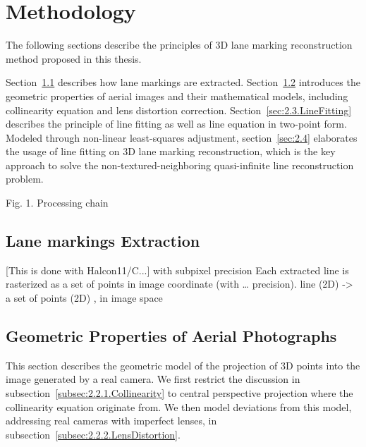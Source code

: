 
\chapter{Methodology}
\label{chap:k2}

The following sections describe the principles of 3D lane marking reconstruction method proposed in this thesis. 

Section~\ref{sec:2.1.LineExtraction} describes how lane markings are extracted.
Section~\ref{sec:2.2.Geometry} introduces the geometric properties of aerial images and their mathematical models, including collinearity equation and lens distortion correction. 
Section~\ref{sec:2.3.LineFitting} describes the principle of line fitting as well as line equation in two-point form.
Modeled through non-linear least-squares adjustment, section~\ref{sec:2.4} elaborates the usage of line fitting on 3D lane marking reconstruction, which is the key approach to solve the non-textured-neighboring quasi-infinite line reconstruction problem.




Fig. 1. Processing chain


\section{Lane markings Extraction}
\label{sec:2.1.LineExtraction}
[This is done with Halcon11/C...]
with subpixel precision
Each extracted line is rasterized as a set of points in image coordinate (with … precision).
line (2D) -> a set of points (2D) , in image space
\section{Geometric Properties of Aerial Photographs}
\label{sec:2.2.Geometry}

This section describes the geometric model of the projection of 3D points into the image generated by a real camera. We first restrict the discussion in subsection~\ref{subsec:2.2.1.Collinearity} to central perspective projection where the collinearity equation originate from. We then model deviations from this model, addressing real cameras with imperfect lenses, in subsection~\ref{subsec:2.2.2.LensDistortion}.

